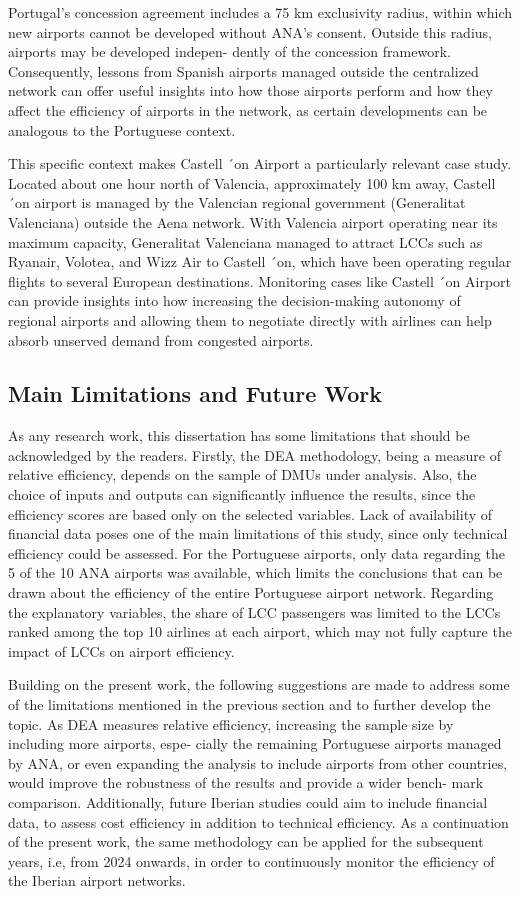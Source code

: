 Portugal’s concession agreement includes a 75 km exclusivity radius, within which new airports
cannot be developed without ANA’s consent. Outside this radius, airports may be developed indepen-
dently of the concession framework. Consequently, lessons from Spanish airports managed outside
the centralized network can offer useful insights into how those airports perform and how they affect
the efficiency of airports in the network, as certain developments can be analogous to the Portuguese
context.

This specific context makes Castell ´on Airport a particularly relevant case study. Located about one
hour north of Valencia, approximately 100 km away, Castell ´on airport is managed by the Valencian
regional government (Generalitat Valenciana) outside the Aena network. With Valencia airport operating near its maximum capacity, Generalitat Valenciana managed to
attract LCCs such as Ryanair, Volotea, and Wizz Air to Castell ´on, which have been operating regular
flights to several European destinations. Monitoring cases like Castell ´on Airport can provide insights
into how increasing the decision-making autonomy of regional airports and allowing them to negotiate
directly with airlines can help absorb unserved demand from congested airports.

\subsection{Main Limitations and Future Work}
As any research work, this dissertation has some limitations that should be acknowledged by the
readers. Firstly, the DEA methodology, being a measure of relative efficiency, depends on the sample
of DMUs under analysis. Also, the choice of inputs and outputs can significantly influence the results,
since the efficiency scores are based only on the selected variables. Lack of availability of financial
data poses one of the main limitations of this study, since only technical efficiency could be assessed. For the Portuguese airports, only data regarding the 5 of the 10 ANA airports was
available, which limits the conclusions that can be drawn about the efficiency of the entire Portuguese
airport network. Regarding the explanatory variables, the share of LCC passengers was limited to the LCCs ranked
among the top 10 airlines at each airport, which may not fully capture the impact of LCCs on airport
efficiency.

Building on the present work, the following suggestions are made to address some of the limitations
mentioned in the previous section and to further develop the topic. As DEA measures relative efficiency, increasing the sample size by including more airports, espe-
cially the remaining Portuguese airports managed by ANA, or even expanding the analysis to include
airports from other countries, would improve the robustness of the results and provide a wider bench-
mark comparison. Additionally, future Iberian studies could aim to include financial data, to assess cost
efficiency in addition to technical efficiency. As a continuation of the present work, the same methodology can be applied for the subsequent
years, i.e, from 2024 onwards, in order to continuously monitor the efficiency of the Iberian airport
networks.